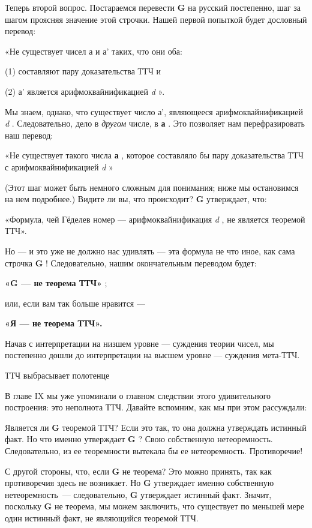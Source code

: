\documentclass[../main.tex]{subfiles}
\begin{document}
Теперь второй вопрос. Постараемся перевести \textbf{G} на русский постепенно, шаг за шагом проясняя значение этой строчки. Нашей первой попыткой будет дословный перевод:

«Не существует чисел а и а' таких, что они оба:

(1) составляют пару доказательства ТТЧ и

(2) а' является арифмоквайнификацией \emph{d} ».

Мы знаем, однако, что существует число а', являющееся арифмоквайнификацией \emph{d} . Следовательно, дело в \emph{другом} числе, в \textbf{а} . Это позволяет нам перефразировать наш перевод:

«Не существует такого числа \textbf{а} , которое составляло бы пару доказательства ТТЧ с арифмоквайнификацией \emph{d} »

(Этот шаг может быть немного сложным для понимания; ниже мы остановимся на нем подробнее.) Видите ли вы, что происходит? \textbf{G} утверждает, что:

«Формула, чей Гёделев номер --- арифмоквайнификация \emph{d} , не является теоремой ТТЧ».

Но --- и это уже не должно нас удивлять --- эта формула не что иное, как сама строчка \textbf{G} ! Следовательно, нашим окончательным переводом будет:

\textbf{«G --- не теорема ТТЧ»} ;

или, если вам так больше нравится ---

\textbf{«Я --- не теорема ТТЧ».}

Начав с интерпретации на низшем уровне --- суждения теории чисел, мы постепенно дошли до интерпретации на высшем уровне --- суждения мета-ТТЧ.

ТТЧ выбрасывает полотенце

В главе IX мы уже упоминали о главном следствии этого удивительного построения: это неполнота ТТЧ. Давайте вспомним, как мы при этом рассуждали:

Является ли \textbf{G} теоремой ТТЧ? Если это так, то она должна утверждать истинный факт. Но что именно утверждает \textbf{G} ? Свою собственную нетеоремность. Следовательно, из ее теоремности вытекала бы ее нетеоремность. Противоречие!

С другой стороны, что, если \textbf{G} не теорема? Это можно принять, так как противоречия здесь не возникает. Но \textbf{G} утверждает именно собственную нетеоремность~--- следовательно, \textbf{G} утверждает истинный факт. Значит, поскольку \textbf{G} не теорема, мы можем заключить, что существует по меньшей мере один истинный факт, не являющийся теоремой ТТЧ.
\end{document}
